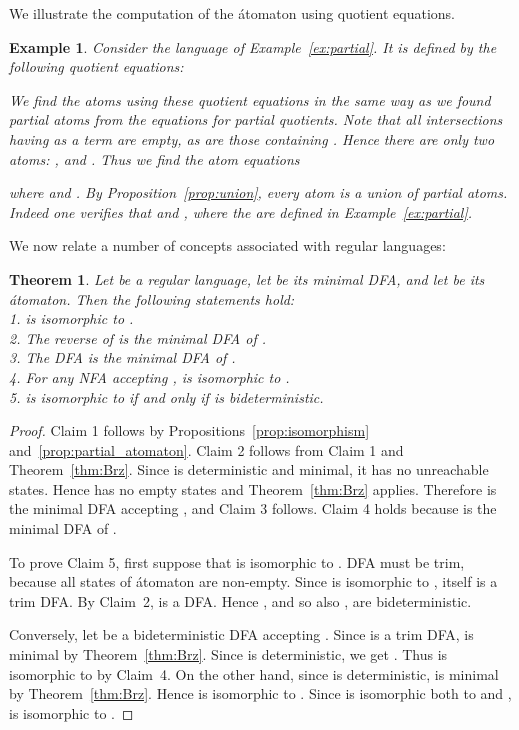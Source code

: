 \documentclass[preprint,12pt]{elsarticle}
\newcommand{\qedb}{\hfill}
\newtheorem{example}{Example}
\newtheorem{theorem}{Theorem}
\begin{document}
We illustrate the computation of the \'atomaton using quotient equations.

\begin{example}
\label{ex:atoms1}
Consider the language  of Example~\ref{ex:partial}.
It is defined by the following quotient equations:
  
We find the atoms using these quotient equations in the same way 
as we found partial atoms from the equations for partial quotients. 
Note that all intersections having  as a term are empty, 
as are those containing .
Hence there are only two atoms: 
, and
. 
Thus we find the atom equations

where  and .
By Proposition~\ref{prop:union}, every atom is a union of partial atoms. 
Indeed one verifies that  and  , 
where the  are defined in Example~\ref{ex:partial}.
\qedb
\end{example}


We now relate a number of concepts associated with regular languages:

\begin{theorem}
\label{thm:atomaton}
Let  be a regular language, let  be its minimal DFA, 
and let  be its \'atomaton. Then the following statements hold:\\
1.  is isomorphic to .\\
2. The reverse  of  is the minimal DFA of .\\
3. The DFA  is the minimal DFA of .\\
4. For any NFA  accepting ,  is isomorphic to  .\\
5.  is isomorphic to  if and only if  is bideterministic.\\
\end{theorem}
\begin{proof}
Claim 1 follows by Propositions~\ref{prop:isomorphism} and~\ref{prop:partial_atomaton}.
Claim 2 follows from Claim 1 and  Theorem~\ref{thm:Brz}.
Since  is deterministic and minimal, it has no unreachable states. 
Hence  has no empty states and Theorem~\ref{thm:Brz} applies. 
Therefore  is the minimal DFA accepting , and Claim 3 follows. 
Claim 4 holds because  is the minimal DFA of .

To prove Claim 5, first suppose that  is isomorphic to .
DFA  must be trim, because all states of \'atomaton  are non-empty.  
Since   is isomorphic to ,  itself is a trim DFA. 
By Claim~2,  is a DFA. 
Hence , and so also , are bideterministic.

Conversely, let  be a bideterministic DFA accepting . 
Since  is a trim DFA,   is minimal by Theorem~\ref{thm:Brz}.
Since  is deterministic, we get .
Thus 
is isomorphic to  by Claim~4.
On the other hand, 
since  is deterministic,  is minimal 
by Theorem~\ref{thm:Brz}. Hence  is isomorphic to .
Since  is isomorphic both to  and , 
 is isomorphic to .
\end{proof}
\end{document}
